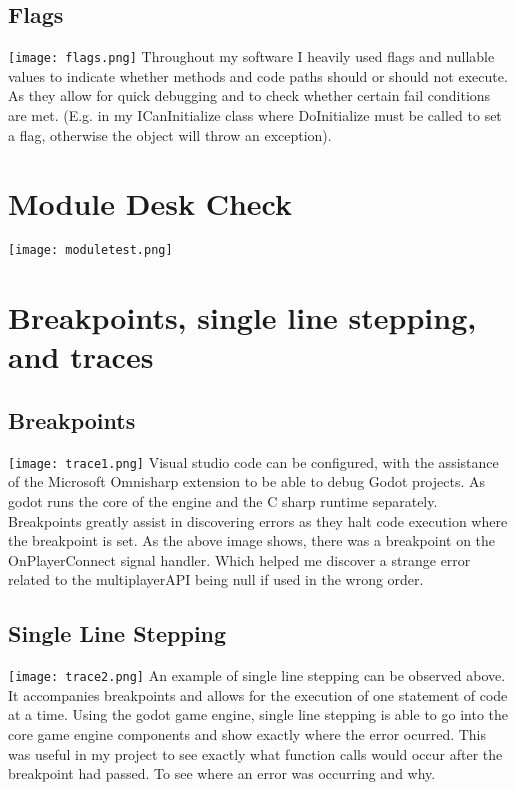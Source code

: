 \documentclass[12pt, DIV=calc]{scrartcl}
\begin{document}
\subsection{Flags}
\texttt{[image: flags.png]}
Throughout my software I heavily used flags and nullable values to indicate whether methods and code paths should or should not execute. As they allow for quick debugging and to check whether certain fail conditions are met. (E.g. in my ICanInitialize class where DoInitialize must be called to set a flag, otherwise the object will throw an exception).






\clearpage
\section{Module Desk Check}
\texttt{[image: moduletest.png]}



\clearpage
\section{Breakpoints, single line stepping, and traces}
\subsection{Breakpoints}
\texttt{[image: trace1.png]}
Visual studio code can be configured, with the assistance of the Microsoft Omnisharp extension to be able to debug Godot projects. As godot runs the core of the engine and the C sharp runtime separately. Breakpoints greatly assist in discovering errors as they halt code execution where the breakpoint is set. As the above image shows, there was a breakpoint on the OnPlayerConnect signal handler. Which helped me discover a strange error related to the multiplayerAPI being null if used in the wrong order.

\subsection{Single Line Stepping}
\texttt{[image: trace2.png]}
An example of single line stepping can be observed above. It accompanies breakpoints and allows for the execution of one statement of code at a time. Using the godot game engine, single line stepping is able to go into the core game engine components and show exactly where the error ocurred. This was useful in my project to see exactly what function calls would occur after the breakpoint had passed. To see where an error was occurring and why.
\end{document}
